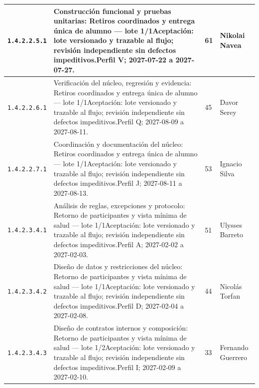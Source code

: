 \begin{longtable}{L{29mm}L{80mm}R{12mm}L{28mm}}
\texttt{1.\allowbreak{}4.\allowbreak{}2.\allowbreak{}2.\allowbreak{}5.\allowbreak{}1} & Construcción funcional y pruebas unitarias: Retiros coordinados y entrega única de alumno — lote 1/1\newline Aceptación: lote versionado y trazable al flujo; revisión independiente sin defectos impeditivos.\newline Perfil V; 2027-07-22 a 2027-07-27. & 61 & Nikolai Navea\\\hline
\texttt{1.\allowbreak{}4.\allowbreak{}2.\allowbreak{}2.\allowbreak{}6.\allowbreak{}1} & Verificación del núcleo, regresión y evidencia: Retiros coordinados y entrega única de alumno — lote 1/1\newline Aceptación: lote versionado y trazable al flujo; revisión independiente sin defectos impeditivos.\newline Perfil Q; 2027-08-09 a 2027-08-11. & 45 & Davor Serey\\\hline
\texttt{1.\allowbreak{}4.\allowbreak{}2.\allowbreak{}2.\allowbreak{}7.\allowbreak{}1} & Coordinación y documentación del núcleo: Retiros coordinados y entrega única de alumno — lote 1/1\newline Aceptación: lote versionado y trazable al flujo; revisión independiente sin defectos impeditivos.\newline Perfil J; 2027-08-11 a 2027-08-13. & 53 & Ignacio Silva\\\hline
\texttt{1.\allowbreak{}4.\allowbreak{}2.\allowbreak{}3.\allowbreak{}4.\allowbreak{}1} & Análisis de reglas, excepciones y protocolo: Retorno de participantes y vista mínima de salud — lote 1/1\newline Aceptación: lote versionado y trazable al flujo; revisión independiente sin defectos impeditivos.\newline Perfil A; 2027-02-02 a 2027-02-03. & 51 & Ulysses Barreto\\\hline
\texttt{1.\allowbreak{}4.\allowbreak{}2.\allowbreak{}3.\allowbreak{}4.\allowbreak{}2} & Diseño de datos y restricciones del núcleo: Retorno de participantes y vista mínima de salud — lote 1/1\newline Aceptación: lote versionado y trazable al flujo; revisión independiente sin defectos impeditivos.\newline Perfil D; 2027-02-04 a 2027-02-08. & 44 & Nicolás Torfan\\\hline
\texttt{1.\allowbreak{}4.\allowbreak{}2.\allowbreak{}3.\allowbreak{}4.\allowbreak{}3} & Diseño de contratos internos y composición: Retorno de participantes y vista mínima de salud — lote 1/2\newline Aceptación: lote versionado y trazable al flujo; revisión independiente sin defectos impeditivos.\newline Perfil I; 2027-02-09 a 2027-02-10. & 33 & Fernando Guerrero\\\hline

\end{longtable}
